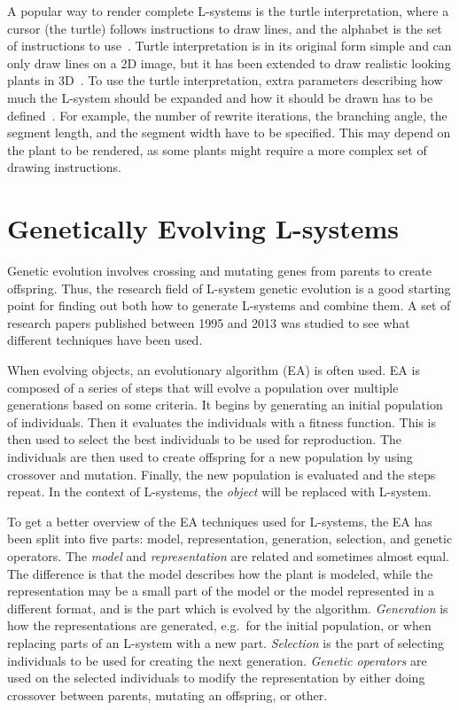 A popular way to render complete L-systems is the turtle interpretation, where a cursor (the turtle) follows instructions to draw lines, and the alphabet is the set of instructions to use~\cite{2012Prusinkiewicz}.
Turtle interpretation is in its original form simple and can only draw lines on a 2D image, but it has been extended to draw realistic looking plants in 3D~\cite{2012Prusinkiewicz}.
To use the turtle interpretation, extra parameters describing how much the L-system should be expanded and how it should be drawn has to be defined~\cite{2012Prusinkiewicz}.
For example, the number of rewrite iterations, the branching angle, the segment length, and the segment width have to be specified.
This may depend on the plant to be rendered, as some plants might require a more complex set of drawing instructions.

\section{Genetically Evolving L-systems}
Genetic evolution involves crossing and mutating genes from parents to create offspring.
Thus, the research field of L-system genetic evolution is a good starting point for finding out both how to generate L-systems and combine them.
A set of research papers published between 1995 and 2013 was studied to see what different techniques have been used.

When evolving objects, an evolutionary algorithm (EA) is often used.
EA is composed of a series of steps that will evolve a population over multiple generations based on some criteria.
It begins by generating an initial population of individuals.
Then it evaluates the individuals with a fitness function.
This is then used to select the best individuals to be used for reproduction.
The individuals are then used to create offspring for a new population by using crossover and mutation.
Finally, the new population is evaluated and the steps repeat.
In the context of L-systems, the \textit{object} will be replaced with L-system.

To get a better overview of the EA techniques used for L-systems, the EA has been split into five parts: model, representation, generation, selection, and genetic operators.
The \textit{model} and \textit{representation} are related and sometimes almost equal.
The difference is that the model describes how the plant is modeled, while the representation may be a small part of the model or the model represented in a different format, and is the part which is evolved by the algorithm.
\textit{Generation} is how the representations are generated, e.g.\ for the initial population, or when replacing parts of an L-system with a new part.
\textit{Selection} is the part of selecting individuals to be used for creating the next generation.
\textit{Genetic operators} are used on the selected individuals to modify the representation by either doing crossover between parents, mutating an offspring, or other.

